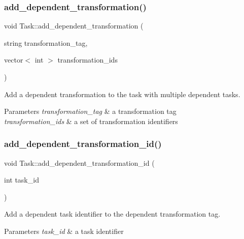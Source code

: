 \subsubsection{\texorpdfstring{add\+\_\+dependent\+\_\+transformation()}{add\_dependent\_transformation()}\hspace{0.1cm}{\footnotesize\ttfamily [2/2]}}
{\footnotesize\ttfamily void Task\+::add\+\_\+dependent\+\_\+transformation (\begin{DoxyParamCaption}\item[{string}]{transformation\+\_\+tag,  }\item[{vector$<$ int $>$}]{transformation\+\_\+ids }\end{DoxyParamCaption})}

Add a dependent transformation to the task with multiple dependent tasks. 
\begin{DoxyParams}{Parameters}
{\em transformation\+\_\+tag} & a transformation tag \\
\hline
{\em transformation\+\_\+ids} & a set of transformation identifiers \\
\hline
\end{DoxyParams}
\mbox{\label{classTask_abe2b72a98501ca9554dd2aa18fad3245}} 
\subsubsection{\texorpdfstring{add\+\_\+dependent\+\_\+transformation\+\_\+id()}{add\_dependent\_transformation\_id()}}
{\footnotesize\ttfamily void Task\+::add\+\_\+dependent\+\_\+transformation\+\_\+id (\begin{DoxyParamCaption}\item[{int}]{task\+\_\+id }\end{DoxyParamCaption})\hspace{0.3cm}{\ttfamily [protected]}}

Add a dependent task identifier to the dependent transformation tag. 
\begin{DoxyParams}{Parameters}
{\em task\+\_\+id} & a task identifier \\
\hline
\end{DoxyParams}
\mbox{\label{classTask_ad549fad4fb70003b2f75bf3ae5a41d46}} 
